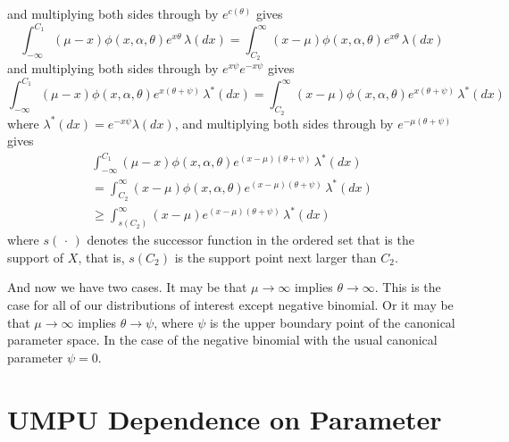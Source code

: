 \documentclass[11pt]{article}
\newcommand{\fatdot}{\,\cdot\,}
\begin{document}
and multiplying both sides through by $e^{c(\theta)}$ gives
$$
   \int_{- \infty}^{C_1} (\mu - x) \phi(x, \alpha, \theta)
   e^{x \theta} \, \lambda(d x)
   =
   \int_{C_2}^\infty (x - \mu) \phi(x, \alpha, \theta)
   e^{x \theta} \, \lambda(d x)
$$
and multiplying both sides through by $e^{x \psi} e^{- x \psi}$ gives
$$
   \int_{- \infty}^{C_1} (\mu - x) \phi(x, \alpha, \theta)
   e^{x (\theta + \psi)} \, \lambda^*(d x)
   =
   \int_{C_2}^\infty (x - \mu) \phi(x, \alpha, \theta)
   e^{x (\theta + \psi)} \, \lambda^*(d x)
$$
where $\lambda^*(d x) = e^{- x \psi} \lambda(d x)$,
and multiplying both sides through by $e^{- \mu (\theta + \psi)}$ gives
\begin{multline*}
   \int_{- \infty}^{C_1} (\mu - x) \phi(x, \alpha, \theta)
   e^{(x - \mu) (\theta + \psi)} \, \lambda^*(d x)
   \\
   =
   \int_{C_2}^\infty (x - \mu) \phi(x, \alpha, \theta)
   e^{(x - \mu) (\theta + \psi)} \, \lambda^*(d x)
   \\
   \ge
   \int_{s(C_2)}^\infty (x - \mu)
   e^{(x - \mu) (\theta + \psi)} \, \lambda^*(d x)
\end{multline*}
where $s(\fatdot)$ denotes the successor function in the ordered set
that is the support of $X$, that is, $s(C_2)$ is the support point next
larger than $C_2$.

And now we have two cases.
It may be that $\mu \to \infty$ implies
$\theta \to \infty$.  This is the case for all of our distributions of
interest except negative binomial.
Or it may be that $\mu \to \infty$ implies $\theta \to \psi$, where $\psi$
is the upper boundary point of the canonical parameter space.  In the case
of the negative binomial with the usual canonical parameter $\psi = 0$.

\section{UMPU Dependence on Parameter}
\end{document}
